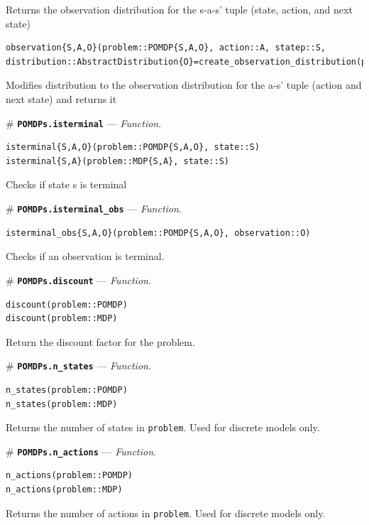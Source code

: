 \documentclass[12pt,]{article}
\begin{document}
Returns the observation distribution for the s-a-s' tuple (state,
action, and next state)

\begin{verbatim}
observation{S,A,O}(problem::POMDP{S,A,O}, action::A, statep::S, distribution::AbstractDistribution{O}=create_observation_distribution(problem))
\end{verbatim}

Modifies distribution to the observation distribution for the a-s' tuple
(action and next state) and returns it

\# \textbf{\texttt{POMDPs.isterminal}} --- \emph{Function}.

\begin{verbatim}
isterminal{S,A,O}(problem::POMDP{S,A,O}, state::S)
isterminal{S,A}(problem::MDP{S,A}, state::S)
\end{verbatim}

Checks if state s is terminal

\# \textbf{\texttt{POMDPs.isterminal\_obs}} --- \emph{Function}.

\begin{verbatim}
isterminal_obs{S,A,O}(problem::POMDP{S,A,O}, observation::O)
\end{verbatim}

Checks if an observation is terminal.

\# \textbf{\texttt{POMDPs.discount}} --- \emph{Function}.

\begin{verbatim}
discount(problem::POMDP)
discount(problem::MDP)
\end{verbatim}

Return the discount factor for the problem.

\# \textbf{\texttt{POMDPs.n\_states}} --- \emph{Function}.

\begin{verbatim}
n_states(problem::POMDP)
n_states(problem::MDP)
\end{verbatim}

Returns the number of states in \texttt{problem}. Used for discrete
models only.

\# \textbf{\texttt{POMDPs.n\_actions}} --- \emph{Function}.

\begin{verbatim}
n_actions(problem::POMDP)
n_actions(problem::MDP)
\end{verbatim}

Returns the number of actions in \texttt{problem}. Used for discrete
models only.
\end{document}
